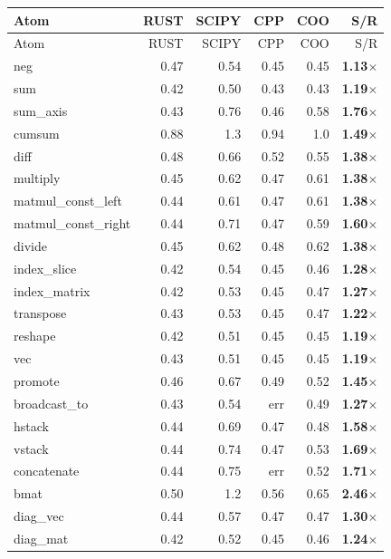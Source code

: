 \documentclass[11pt]{article}
\begin{document}
\begin{center}\small
\begin{longtable}{lrrrrr}
\toprule
Atom & RUST & SCIPY & CPP & COO & S/R \\
\midrule
\endfirsthead
\toprule
Atom & RUST & SCIPY & CPP & COO & S/R \\
\midrule
\endhead
\bottomrule
\endlastfoot
neg & 0.47 & 0.54 & 0.45 & 0.45 & \textbf{1.13$\times$} \\
sum & 0.42 & 0.50 & 0.43 & 0.43 & \textbf{1.19$\times$} \\
sum\_axis & 0.43 & 0.76 & 0.46 & 0.58 & \textbf{1.76$\times$} \\
cumsum & 0.88 & 1.3 & 0.94 & 1.0 & \textbf{1.49$\times$} \\
diff & 0.48 & 0.66 & 0.52 & 0.55 & \textbf{1.38$\times$} \\
multiply & 0.45 & 0.62 & 0.47 & 0.61 & \textbf{1.38$\times$} \\
matmul\_const\_left & 0.44 & 0.61 & 0.47 & 0.61 & \textbf{1.38$\times$} \\
matmul\_const\_right & 0.44 & 0.71 & 0.47 & 0.59 & \textbf{1.60$\times$} \\
divide & 0.45 & 0.62 & 0.48 & 0.62 & \textbf{1.38$\times$} \\
index\_slice & 0.42 & 0.54 & 0.45 & 0.46 & \textbf{1.28$\times$} \\
index\_matrix & 0.42 & 0.53 & 0.45 & 0.47 & \textbf{1.27$\times$} \\
transpose & 0.43 & 0.53 & 0.45 & 0.47 & \textbf{1.22$\times$} \\
reshape & 0.42 & 0.51 & 0.45 & 0.45 & \textbf{1.19$\times$} \\
vec & 0.43 & 0.51 & 0.45 & 0.45 & \textbf{1.19$\times$} \\
promote & 0.46 & 0.67 & 0.49 & 0.52 & \textbf{1.45$\times$} \\
broadcast\_to & 0.43 & 0.54 & err & 0.49 & \textbf{1.27$\times$} \\
hstack & 0.44 & 0.69 & 0.47 & 0.48 & \textbf{1.58$\times$} \\
vstack & 0.44 & 0.74 & 0.47 & 0.53 & \textbf{1.69$\times$} \\
concatenate & 0.44 & 0.75 & err & 0.52 & \textbf{1.71$\times$} \\
bmat & 0.50 & 1.2 & 0.56 & 0.65 & \textbf{2.46$\times$} \\
diag\_vec & 0.44 & 0.57 & 0.47 & 0.47 & \textbf{1.30$\times$} \\
diag\_mat & 0.42 & 0.52 & 0.45 & 0.46 & \textbf{1.24$\times$} \\

\end{longtable}
\end{center}
\end{document}
